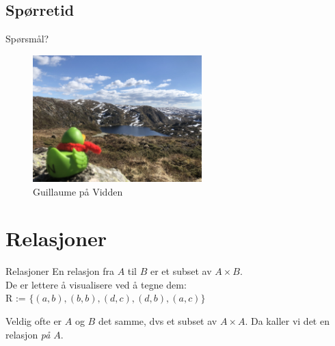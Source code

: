 \subsection*{Spørretid}
\begin{frame}{Spørsmål?}
    \begin{figure}
        \centering
        \includegraphics[height = 4.9cm]{images/guillaume4.jpg}
        \caption{Guillaume på Vidden}
        \label{fig:guillaume4}
    \end{figure}
\end{frame}

\section{Relasjoner}
\begin{frame}[fragile]{Relasjoner}
    En relasjon fra $A$ til $B$ er et subset av $A \times B$.\\
    De er lettere å visualisere ved å tegne dem:\\
    
    R := $\{(a, b), (b, b), (d, c), (d, b), (a, c)\}$\\

Veldig ofte er $A$ og $B$ det samme, dvs et subset av $A \times A$. Da kaller vi det en relasjon \emph{på} $A$.
\end{frame}

